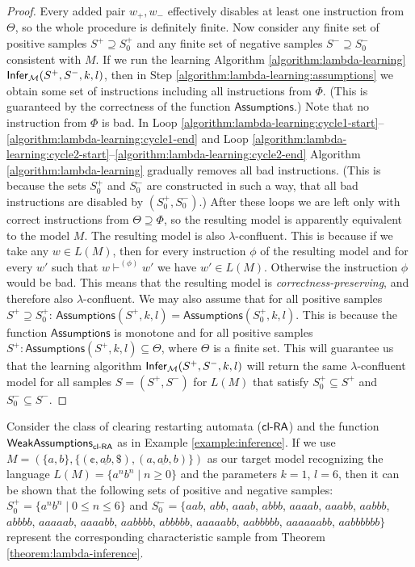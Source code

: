 \begin{proof}
Every added pair $w_+, w_-$ effectively disables at least one instruction from $\Theta$, so the whole procedure is definitely finite. Now consider any finite set of positive samples $S^+ \supseteq S_0^+$ and any finite set of negative samples $S^- \supseteq S_0^-$ consistent with $M$. If we run the learning Algorithm \ref{algorithm:lambda-learning} $\mathsf{Infer}_{\textup{\sf $\mathcal{M}$}}(S^+, S^-, k, l)$, then in Step \ref{algorithm:lambda-learning:assumptions} we obtain some set of instructions including all instructions from $\Phi$. (This is guaranteed by the correctness of the function $\mathsf{Assumptions}$.) Note that no instruction from $\Phi$ is bad. In Loop \ref{algorithm:lambda-learning:cycle1-start}--\ref{algorithm:lambda-learning:cycle1-end} and Loop \ref{algorithm:lambda-learning:cycle2-start}--\ref{algorithm:lambda-learning:cycle2-end} Algorithm \ref{algorithm:lambda-learning} gradually removes all bad instructions. (This is because the sets $S_0^+$ and $S_0^-$ are constructed in such a way, that all bad instructions are disabled by $(S_0^+, S_0^-)$.) After these loops we are left only with correct instructions from $\Theta \supseteq \Phi$, so the resulting model is apparently equivalent to the model $M$. The resulting model is also $\lambda$-confluent. This is because if we take any $w \in L(M)$, then for every instruction $\phi$ of the resulting model and for every $w'$ such that $w \vdash^{(\phi)} w'$ we have $w' \in L(M)$. Otherwise the instruction $\phi$ would be bad. This means that the resulting model is \emph{correctness-preserving}, and therefore also $\lambda$-confluent. We may also assume that for all positive samples $S^+ \supseteq S_0^+$: $\mathsf{Assumptions}(S^+, k, l) = \mathsf{Assumptions}(S_0^+, k, l)$. This is because the function $\mathsf{Assumptions}$ is monotone and for all positive samples $S^+: \mathsf{Assumptions}(S^+, k, l) \subseteq \Theta$, where $\Theta$ is a finite set. This will guarantee us that the learning algorithm $\mathsf{Infer}_{\textup{\sf $\mathcal{M}$}}(S^+, S^-, k, l)$ will return the same $\lambda$-confluent model for all samples $S = (S^+, S^-)$ for $L(M)$ that satisfy $S_0^+ \subseteq S^+$ and $S_0^- \subseteq S^-$.
\end{proof}

\begin{example}[\cite{C12}]
Consider the class of clearing restarting automata ($\textup{\sf cl-RA\/}$) and the function $\mathsf{WeakAssumptions}_{\textup{\sf cl-RA\/}}$ as in Example \ref{example:inference}. If we use $M = (\{a, b\}, \{(\cent, \underline{ab}, \$), (a, \underline{ab}, b) \})$ as our target model recognizing the language $L(M) = \{a^n b^n \mid n \ge 0 \}$ and the parameters $k = 1$, $l = 6$, then it can be shown that the following sets of positive and negative samples: 
$S_0^+ = \{ a^n b^n \mid 0 \le n \le 6 \}$ and
$S_0^- = \{ aab$, $abb$, $aaab$, $abbb$, $aaaab$, $aaabb$, $aabbb$, $abbbb$, 
$aaaaab$, $aaaabb$, $aabbbb$, $abbbbb$, $aaaaabb$, $aabbbbb$, 
$aaaaaabb$, $aabbbbbb \}$ represent the corresponding characteristic sample from Theorem \ref{theorem:lambda-inference}.
\end{example}

